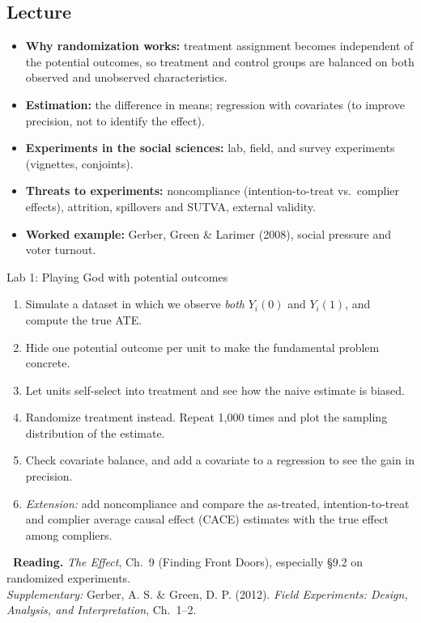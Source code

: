 \documentclass[11pt,a4paper]{article}
\newcommand{\TheEffect}{\emph{The Effect}}
\begin{document}
\subsection{Lecture}
\begin{itemize}
  \item \textbf{Why randomization works:} treatment assignment becomes independent of the potential outcomes, so treatment and control groups are balanced on both observed and unobserved characteristics.
  \item \textbf{Estimation:} the difference in means; regression with covariates (to improve precision, not to identify the effect).
  \item \textbf{Experiments in the social sciences:} lab, field, and survey experiments (vignettes, conjoints).
  \item \textbf{Threats to experiments:} noncompliance (intention-to-treat vs.\ complier effects), attrition, spillovers and SUTVA, external validity.
  \item \textbf{Worked example:} Gerber, Green \& Larimer (2008), social pressure and voter turnout.
\end{itemize}

\begin{labbox}{Lab 1: Playing God with potential outcomes}
\begin{enumerate}[leftmargin=1.4em]
  \item Simulate a dataset in which we observe \emph{both} $Y_i(0)$ and $Y_i(1)$, and compute the true ATE.
  \item Hide one potential outcome per unit to make the fundamental problem concrete.
  \item Let units self-select into treatment and see how the naive estimate is biased.
  \item Randomize treatment instead. Repeat 1{,}000 times and plot the sampling distribution of the estimate.
  \item Check covariate balance, and add a covariate to a regression to see the gain in precision.
  \item \emph{Extension:} add noncompliance and compare the as-treated, intention-to-treat and complier average causal effect (CACE) estimates with the true effect among compliers.
\end{enumerate}
\end{labbox}

\begin{reading}
\textbf{\faBookOpen\ Reading.}
\TheEffect, Ch.~9 (Finding Front Doors), especially \S9.2 on randomized experiments.\\
\emph{Supplementary:} Gerber, A. S. \& Green, D. P. (2012). \emph{Field Experiments: Design, Analysis, and Interpretation}, Ch.~1--2.
\end{reading}
\end{document}
